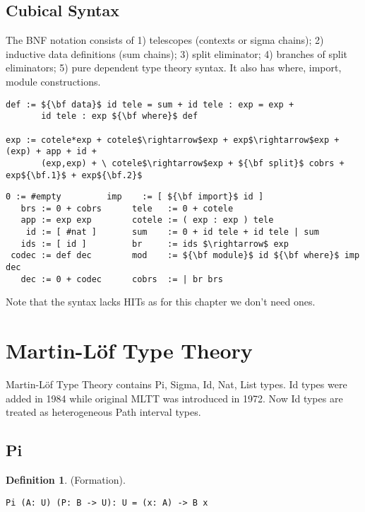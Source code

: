 \documentclass{article}
\theoremstyle{definition}
\newtheorem{definition}{Definition}
\begin{document}
\subsection*{Cubical Syntax}

The BNF notation consists of 1) telescopes (contexts or sigma chains);
2) inductive data definitions (sum chains); 3) split eliminator;
4) branches of split eliminators; 5) pure dependent type theory syntax.
It also has where, import, module constructions.

\begin{lstlisting}[mathescape=true]
def := ${\bf data}$ id tele = sum + id tele : exp = exp +
       id tele : exp ${\bf where}$ def

exp := cotele*exp + cotele$\rightarrow$exp + exp$\rightarrow$exp + (exp) + app + id +
       (exp,exp) + \ cotele$\rightarrow$exp + ${\bf split}$ cobrs + exp${\bf.1}$ + exp${\bf.2}$
\end{lstlisting}

\begin{lstlisting}[mathescape=true]
     0 := #empty         imp    := [ ${\bf import}$ id ]
   brs := 0 + cobrs      tele   := 0 + cotele
   app := exp exp        cotele := ( exp : exp ) tele
    id := [ #nat ]       sum    := 0 + id tele + id tele | sum
   ids := [ id ]         br     := ids $\rightarrow$ exp
 codec := def dec        mod    := ${\bf module}$ id ${\bf where}$ imp dec
   dec := 0 + codec      cobrs  := | br brs
\end{lstlisting}

Note that the syntax lacks HITs as for this chapter we don't need ones.



\newpage
\section{Martin-Löf Type Theory}

Martin-Löf Type Theory contains Pi, Sigma, Id, Nat, List types.
Id types were added in 1984 while original MLTT was introduced in 1972.
Now Id types are treated as heterogeneous Path interval types.

\subsection{Pi}


\begin{definition} (Formation).
\begin{lstlisting}
Pi (A: U) (P: B -> U): U = (x: A) -> B x
\end{lstlisting}
\end{definition}
\end{document}
